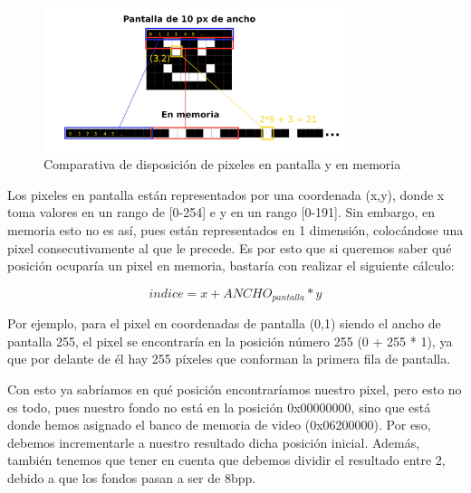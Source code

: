 \begin{figure}[htbp]
\centering
  \includegraphics[width=0.8\textwidth]{archivos/screen_vs_memory.png}
  \caption{Comparativa de disposición de pixeles en pantalla y en memoria}
  \label{fig:screen_vs_memory}
\end{figure}

\vspace{0.5cm}

Los pixeles en pantalla están representados por una coordenada (x,y), donde x toma valores en un rango de [0-254] e y en un rango [0-191]. Sin embargo, en memoria esto no es así, pues están representados en 1 dimensión, colocándose una pixel consecutivamente al que le precede. Es por esto que si queremos saber qué posición ocuparía un pixel en memoria, bastaría con realizar el siguiente cálculo:

\vspace{0.5cm}

\begin{equation}
indice = x + ANCHO_{pantalla} * y
\end{equation}

\vspace{0.5cm}

Por ejemplo, para el pixel en coordenadas de pantalla (0,1) siendo el ancho de pantalla 255, el pixel se encontraría en la posición número 255 (0 + 255 * 1), ya que por delante de él hay 255 píxeles que conforman la primera fila de pantalla.

\vspace{0.5cm}

Con esto ya sabríamos en qué posición encontraríamos nuestro pixel, pero esto no es todo, pues nuestro fondo no está en la posición 0x00000000, sino que está donde hemos asignado el banco de memoria de video (0x06200000). Por eso, debemos incrementarle a nuestro resultado dicha posición inicial. Además, también tenemos que tener en cuenta que debemos dividir el resultado entre 2, debido a que los fondos pasan a ser de 8bpp.

